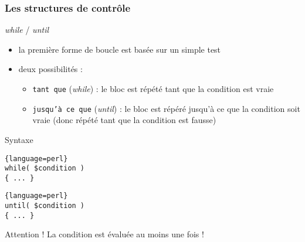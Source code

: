 \begin{frame}[fragile]
  \frametitle{Les structures de contrôle}

  \begin{block}{\textit{while} / \textit{until}}
    \begin{itemize}
    \item la première forme de boucle est basée sur un simple test
    \item deux possibilités :
      \begin{itemize}
      \item \texttt{tant que} (\textit{while}) : le bloc est répété tant que
        la condition est vraie
      \item \texttt{jusqu'à ce que} (\textit{until}) : le bloc est répéré
        jusqu'à ce que la condition soit vraie (donc répété tant que la
        condition est fausse)
      \end{itemize}
    \end{itemize}
  \end{block}

  \begin{exampleblock}{Syntaxe}
    \begin{lstlisting}{language=perl}
while( $condition )
{ ... }
    \end{lstlisting}
    \begin{lstlisting}{language=perl}
until( $condition )
{ ... }
    \end{lstlisting}
  \end{exampleblock}

  \begin{alertblock}{Attention !}
    La condition est évaluée au moins une fois !
  \end{alertblock}

\end{frame}

